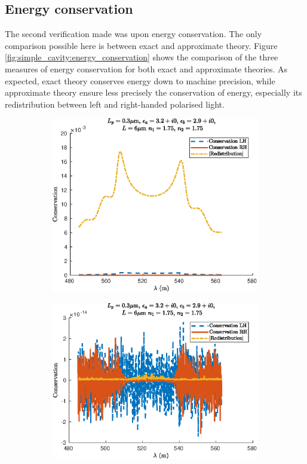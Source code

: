 \subsection{Energy conservation}

The second verification made was upon energy conservation. The only comparison possible here is between exact and approximate theory. Figure \ref{fig:simple_cavity:energy_conservation} shows the comparison of the three measures of energy conservation for both exact and approximate theories. As expected, exact theory conserves energy down to machine precision, while approximate theory ensure less precisely the conservation of energy, especially its redistribution between left and right-handed polarised light.

\begin{figure}
	\centering
	\begin{subfigure}{0.49\linewidth}
		\includegraphics[width=\linewidth]{plots/simple/energy_cwt}
		\caption{}
		\label{fig:energy_cwt}
	\end{subfigure}
	\begin{subfigure}{0.49\linewidth}
		\includegraphics[width=\linewidth]{plots/simple/energy_oseen}

\end{subfigure}
\end{figure}
